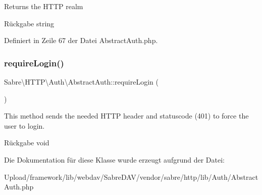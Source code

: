 Returns the H\+T\+TP realm

\begin{DoxyReturn}{Rückgabe}
string 
\end{DoxyReturn}


Definiert in Zeile 67 der Datei Abstract\+Auth.\+php.

\mbox{\label{class_sabre_1_1_h_t_t_p_1_1_auth_1_1_abstract_auth_a05b82808b4e609f9539c9f717bcb09be}} 
\subsubsection{\texorpdfstring{require\+Login()}{requireLogin()}}
{\footnotesize\ttfamily Sabre\textbackslash{}\+H\+T\+T\+P\textbackslash{}\+Auth\textbackslash{}\+Abstract\+Auth\+::require\+Login (\begin{DoxyParamCaption}{ }\end{DoxyParamCaption})\hspace{0.3cm}{\ttfamily [abstract]}}

This method sends the needed H\+T\+TP header and statuscode (401) to force the user to login.

\begin{DoxyReturn}{Rückgabe}
void 
\end{DoxyReturn}


Die Dokumentation für diese Klasse wurde erzeugt aufgrund der Datei\+:\begin{DoxyCompactItemize}
\item 
Upload/framework/lib/webdav/\+Sabre\+D\+A\+V/vendor/sabre/http/lib/\+Auth/Abstract\+Auth.\+php\end{DoxyCompactItemize}
